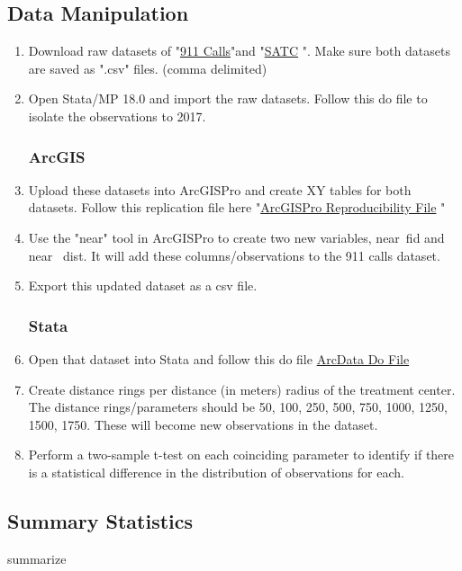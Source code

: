 \documentclass[12pt]{article}
\begin{document}
\subsection{Data Manipulation}
\begin{enumerate}
    \item Download raw datasets of "\href{https://data.detroitmi.gov/datasets/detroitmi::police-serviced-911-calls/about}{911 Calls}"and "\href{https://github.com/ecn310/course-project-zipcentercrime/blob/main/detroit_samhsa_sud_2015_2021.dta}{SATC} ". Make sure both datasets are saved as ".csv" files. (comma delimited)
    \item Open Stata/MP 18.0 and import the raw datasets. Follow this do file to isolate the observations to 2017.
\subsubsection{ArcGIS}
    \item Upload these datasets into ArcGISPro and create XY tables for both datasets. Follow this replication file here "\href{https://github.com/ecn310/course-project-zipcentercrime/blob/main/ArcGIS_Reproducability.md}{ArcGISPro Reproducibility File} "
    \item Use the "near" tool in ArcGISPro to create two new variables, near\textunderscore\ fid and near \textunderscore\ dist. It will add these columns/observations to the 911 calls dataset. 
    \item Export this updated dataset as a csv file. 
    \subsubsection{Stata}
    \item Open that dataset into Stata and follow this do file \href{C:\Users\sorti\OneDrive\Desktop\ArcDataDo.do.txt}{ArcData Do File}
    \item Create distance rings per distance (in meters) radius of the treatment center. The distance rings/parameters should be 50, 100, 250, 500, 750, 1000, 1250, 1500, 1750. These will become new observations in the dataset. 
    \item Perform a two-sample t-test on each coinciding parameter to identify if there is a statistical difference in the distribution of observations for each. 
\end{enumerate}

\subsection{Summary Statistics}
 summarize
\end{document}
